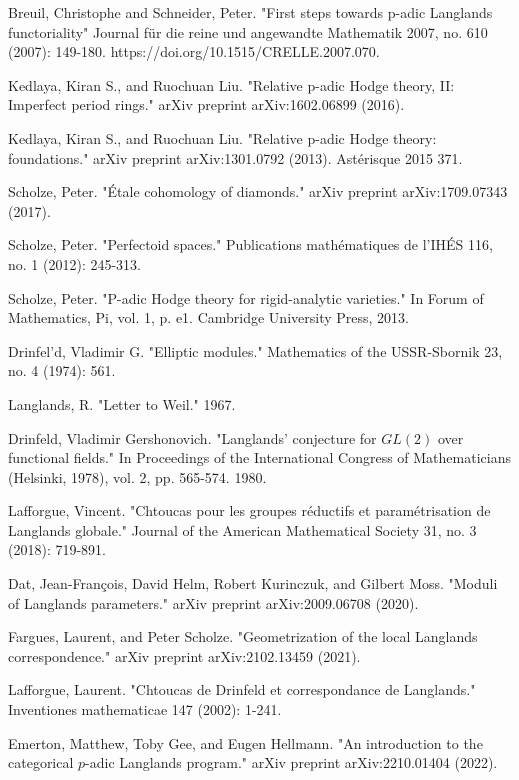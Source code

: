 \documentclass[12pt]{article}
\theoremstyle{definition}
\begin{document}
\begin{thebibliography}{}
 Breuil, Christophe and Schneider, Peter. "First steps towards p-adic Langlands functoriality" Journal f\"ur die reine und angewandte Mathematik 2007, no. 610 (2007): 149-180. https://doi.org/10.1515/CRELLE.2007.070.

 Kedlaya, Kiran S., and Ruochuan Liu. "Relative p-adic Hodge theory, II: Imperfect period rings." arXiv preprint arXiv:1602.06899 (2016).

 Kedlaya, Kiran S., and Ruochuan Liu. "Relative p-adic Hodge theory: foundations." arXiv preprint arXiv:1301.0792 (2013). Ast\'erisque 2015 371.

 Scholze, Peter. "\'Etale cohomology of diamonds." arXiv preprint arXiv:1709.07343 (2017).

 Scholze, Peter. "Perfectoid spaces." Publications math\'ematiques de l'IH\'ES 116, no. 1 (2012): 245-313.

 Scholze, Peter. "P-adic Hodge theory for rigid-analytic varieties." In Forum of Mathematics, Pi, vol. 1, p. e1. Cambridge University Press, 2013.

 Drinfel'd, Vladimir G. "Elliptic modules." Mathematics of the USSR-Sbornik 23, no. 4 (1974): 561.


 Langlands, R. "Letter to Weil." 1967.

 Drinfeld, Vladimir Gershonovich. "Langlands' conjecture for $GL (2)$ over functional fields." In Proceedings of the International Congress of Mathematicians (Helsinki, 1978), vol. 2, pp. 565-574. 1980.

 Lafforgue, Vincent. "Chtoucas pour les groupes r\'eductifs et param\'etrisation de Langlands globale." Journal of the American Mathematical Society 31, no. 3 (2018): 719-891.

 Dat, Jean-Fran\c{c}ois, David Helm, Robert Kurinczuk, and Gilbert Moss. "Moduli of Langlands parameters." arXiv preprint arXiv:2009.06708 (2020).

 Fargues, Laurent, and Peter Scholze. "Geometrization of the local Langlands correspondence." arXiv preprint arXiv:2102.13459 (2021).

 Lafforgue, Laurent. "Chtoucas de Drinfeld et correspondance de Langlands." Inventiones mathematicae 147 (2002): 1-241.

 Emerton, Matthew, Toby Gee, and Eugen Hellmann. "An introduction to the categorical $p$-adic Langlands program." arXiv preprint arXiv:2210.01404 (2022).


\end{thebibliography}
\end{document}
